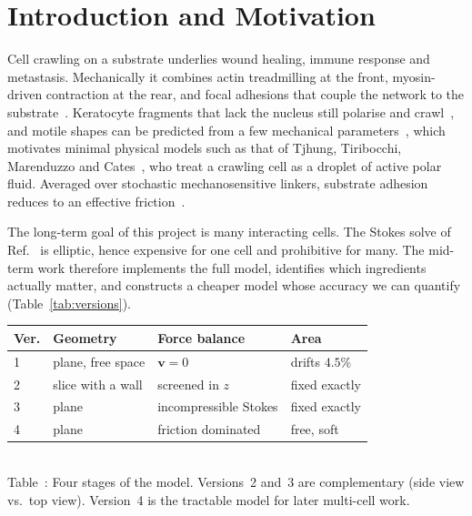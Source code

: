 \documentclass[11pt]{article}
\begin{document}
\vspace{4pt}
\pagestyle{plain}
\small
\setcounter{page}{1}
\section{Introduction and Motivation}
\label{sec:intro}

\noindent
Cell crawling on a substrate underlies wound healing, immune response and
metastasis. Mechanically it combines actin treadmilling at the front,
myosin-driven contraction at the rear, and focal adhesions that couple the
network to the substrate~\cite{Bray:2000}. Keratocyte fragments that lack the
nucleus still polarise and crawl~\cite{Verkhovsky:1999}, and motile shapes can
be predicted from a few mechanical parameters~\cite{Keren:2008}, which
motivates minimal physical models such as that of Tjhung, Tiribocchi,
Marenduzzo and Cates~\cite{Tjhung:2015}, who treat a crawling cell as a
droplet of active polar fluid. Averaged over stochastic mechanosensitive
linkers, substrate adhesion reduces to an effective
friction~\cite{Leoni:2017,Ziebert:2013}.

The long-term goal of this project is many interacting cells. The Stokes
solve of Ref.~\cite{Tjhung:2015} is elliptic, hence expensive for one cell
and prohibitive for many. The mid-term work therefore implements the full
model, identifies which ingredients actually matter, and constructs a
cheaper model whose accuracy we can quantify (Table~\ref{tab:versions}).

\begin{center}
\begin{minipage}{\textwidth}
\centering
\begin{tabular}{|l|l|l|l|}
\hline
Ver. & Geometry & Force balance & Area \\
\hline
1 & plane, free space & $\mathbf{v}=0$ & drifts $4.5\%$ \\
\hline
2 & slice with a wall & screened in $z$ & fixed exactly \\
\hline
3 & plane & incompressible Stokes & fixed exactly \\
\hline
4 & plane & friction dominated & free, soft \\
\hline
\end{tabular}\\[3pt]
\label{tab:versions}
{\small Table~\thetable: Four stages of the model. Versions~2 and~3 are
complementary (side view vs.\ top view). Version~4 is the tractable model
for later multi-cell work.}
\end{minipage}
\end{center}
\end{document}
